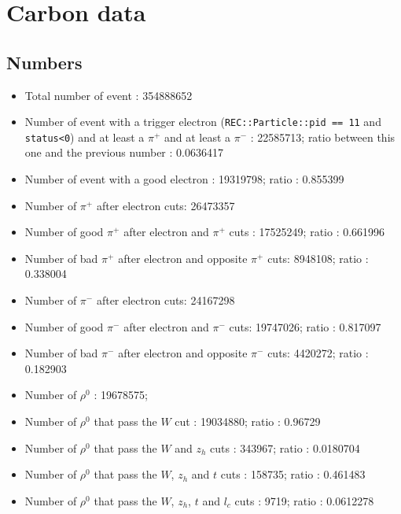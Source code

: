 \documentclass{report}
\begin{document}
    \section{Carbon data}
    \subsection{Numbers}
    
    \begin{itemize}
        \item Total number of event : 354888652
        \item Number of event with a trigger electron (\texttt{REC::Particle::pid == 11} and \texttt{status<0}) and at least a \(\pi^+\) and at least a \(\pi^-\) : 22585713; ratio between this one and the previous number : 0.0636417
        \item Number of event with a good electron : 19319798; ratio : 0.855399
        \item Number of \(\pi^+\) after electron cuts: 26473357
        \item Number of good \(\pi^+\) after electron and \(\pi^+\) cuts : 17525249; ratio : 0.661996
        \item Number of bad \(\pi^+\) after electron and opposite \(\pi^+\) cuts: 8948108; ratio : 0.338004
        \item Number of \(\pi^-\) after electron cuts: 24167298
        \item Number of good \(\pi^-\) after electron and \(\pi^-\) cuts: 19747026; ratio : 0.817097
        \item Number of bad \(\pi^-\) after electron and opposite \(\pi^-\) cuts: 4420272; ratio : 0.182903
        \item Number of \(\rho^0\) : 19678575;
        \item Number of \(\rho^0\) that pass the \(W\) cut : 19034880; ratio : 0.96729
        \item Number of \(\rho^0\) that pass the \(W\) and \(z_h\) cuts : 343967; ratio : 0.0180704
        \item Number of \(\rho^0\) that pass the \(W\), \(z_h\) and \(t\) cuts : 158735; ratio : 0.461483
        \item Number of \(\rho^0\) that pass the \(W\), \(z_h\), \(t\) and \(l_c\) cuts : 9719; ratio : 0.0612278
    \end{itemize}
    

    

    
\end{document}
